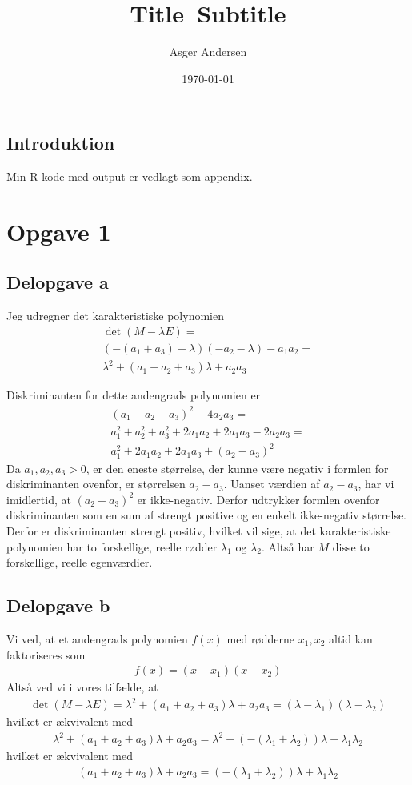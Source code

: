 \documentclass[12pt]{article}
\title{
  Title\
  \large Subtitle
}
\author{Asger Andersen}
\date{\today}
\begin{document}
\subsection*{Introduktion}

Min R kode med output er vedlagt som appendix.

\section{Opgave 1}

\subsection{Delopgave a}

Jeg udregner det karakteristiske polynomien
\begin{align}
\det(M-\lambda E) = \\ 
(-(a_1 + a_3) - \lambda)(-a_2 - \lambda) - a_1a_2 = \\
\lambda^2 + (a_1 + a_2 + a_3)\lambda + a_2a_3
\end{align}

Diskriminanten for dette andengrads polynomien er
\begin{align}
(a_1 + a_2 + a_3)^2 - 4a_2a_3 = \\ 
a_1^2 + a_2^2 + a_3^2 + 2a_1a_2 + 2a_1a_3 - 2a_2a_3 = \\
a_1^2 + 2a_1a_2 + 2a_1a_3 + (a_2 - a_3)^2
\end{align}
Da $a_1,a_2,a_3>0$, er den eneste størrelse, der kunne være negativ i formlen for diskriminanten ovenfor, er størrelsen $a_2 - a_3$. Uanset værdien af $a_2 - a_3$, har vi imidlertid, at $(a_2 - a_3)^2$ er ikke-negativ. Derfor udtrykker formlen ovenfor diskriminanten som en sum af strengt positive og en enkelt ikke-negativ størrelse. Derfor er diskriminanten strengt positiv, hvilket vil sige, at det karakteristiske polynomien har to forskellige, reelle rødder $\lambda_1$ og $\lambda_2$. Altså har $M$ disse to forskellige, reelle egenværdier.

\subsection{Delopgave b}

Vi ved, at et andengrads polynomien $f(x)$ med rødderne $x_1, x_2$ altid kan faktoriseres som
\begin{align}
f(x) = (x-x_1)(x-x_2)
\end{align}
Altså ved vi i vores tilfælde, at
\begin{align}
\det(M-\lambda E) = \lambda^2 + (a_1 + a_2 + a_3)\lambda + a_2a_3 = (\lambda - \lambda_1)(\lambda - \lambda_2)
\end{align}
hvilket er ækvivalent med
\begin{align}
\lambda^2 + (a_1 + a_2 + a_3)\lambda + a_2a_3 =  \lambda^2 + (-(\lambda_1 + \lambda_2))\lambda + \lambda_1\lambda_2
\end{align}
hvilket er ækvivalent med
\begin{align}
(a_1 + a_2 + a_3)\lambda + a_2a_3 =  (-(\lambda_1 + \lambda_2))\lambda + \lambda_1\lambda_2
\end{align}
\end{document}
